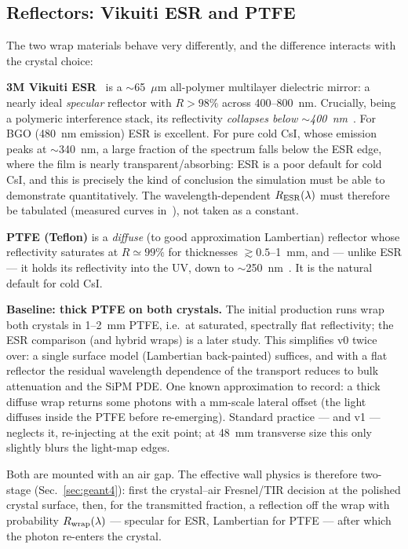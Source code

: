 \documentclass[11pt,a4paper]{article}
\newcommand{\csi}{CsI}
\newcommand{\bgo}{BGO}
\begin{document}
\subsection{Reflectors: Vikuiti ESR and PTFE}
\label{sec:reflectors}

The two wrap materials behave very differently, and the difference interacts with the
crystal choice:

\textbf{3M Vikuiti ESR}~\cite{vikuiti} is a $\sim$65~$\mu$m all-polymer multilayer dielectric
mirror: a nearly ideal \emph{specular} reflector with $R > 98\%$ across 400--800~nm.
Crucially, being a polymeric interference stack, its reflectivity \emph{collapses below
$\sim$400~nm}~\cite{janecek2008}. For \bgo{} (480~nm emission) ESR is excellent. For pure cold
\csi{}, whose emission peaks at $\sim$340~nm, a large fraction of the spectrum falls below the
ESR edge, where the film is nearly transparent/absorbing: ESR is a poor default for cold
\csi{}, and this is precisely the kind of conclusion the simulation must be able to
demonstrate quantitatively. The wavelength-dependent $R_{\rm ESR}(\lambda)$ must therefore be
tabulated (measured curves in~\cite{janecek2008}), not taken as a constant.

\textbf{PTFE (Teflon)} is a \emph{diffuse} (to good approximation Lambertian) reflector whose
reflectivity saturates at $R \simeq 99\%$ for thicknesses $\gtrsim 0.5$--1~mm, and --- unlike
ESR --- it holds its reflectivity into the UV, down to $\sim$250~nm~\cite{janecek2008,
janecek2012}. It is the natural default for cold \csi{}.

\textbf{Baseline: thick PTFE on both crystals.} The initial production runs wrap both
crystals in 1--2~mm PTFE, i.e.\ at saturated, spectrally flat reflectivity; the ESR
comparison (and hybrid wraps) is a later study. This simplifies v0 twice over: a single
surface model (Lambertian back-painted) suffices, and with a flat reflector the residual
wavelength dependence of the transport reduces to bulk attenuation and the SiPM PDE. One
known approximation to record: a thick diffuse wrap returns some photons with a mm-scale
lateral offset (the light diffuses inside the PTFE before re-emerging). Standard practice
--- and v1 --- neglects it, re-injecting at the exit point; at 48~mm transverse size this
only slightly blurs the light-map edges.

Both are mounted with an air gap. The effective wall physics is therefore two-stage
(Sec.~\ref{sec:geant4}): first the crystal--air Fresnel/TIR decision at the polished
crystal surface, then, for the transmitted fraction, a reflection off the wrap with
probability $R_{\rm wrap}(\lambda)$ --- specular for ESR, Lambertian for PTFE --- after which
the photon re-enters the crystal.
\end{document}
